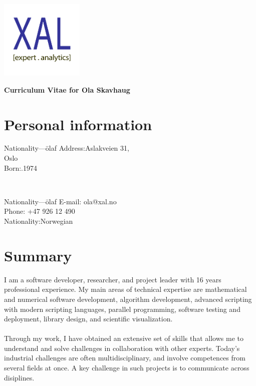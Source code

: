 \documentclass[english,a4paper,11pt]{article}
\begin{document}
\vspace*{-3cm}
\hspace*{12.5cm}\includegraphics[width=4cm]{logo.pdf}

\vspace*{-1.65cm}

\noindent
{\LARGE \bfseries \color{xaldark}Curriculum Vitae for Ola Skavhaug}

\section*{Personal information}

\begin{minipage}[t]{0.4\textwidth}
\begin{tabbing}Nationality---\=olaf\kill 
Address:\>Aslakveien 31, \\
 Oslo \\
Born:.1974 \\
\end{tabbing}
\end{minipage}
$\quad\quad$
\begin{minipage}[t]{0.3\textwidth}
\begin{tabbing}Nationality---\=olaf\kill 
E-mail: \>ola@xal.no\\
Phone: \>+47 926 12 490\\
Nationality:\>Norwegian\\
\end{tabbing}
\end{minipage}

\section*{Summary}
I am a software developer, researcher, and project leader with 16 years professional experience. My main areas of technical expertise are mathematical and numerical software development, algorithm development, advanced scripting with modern scripting languages, parallel programming, software testing and deployment, library design, and scientific visualization.\\
\\
Through my work, I have obtained an extensive set of skills that allows me to understand and solve challenges in collaboration with other experts. Today's industrial challenges are often multidisciplinary, and involve competences from several fields at once. A key challenge in such projects is to communicate across disiplines.
\end{document}
